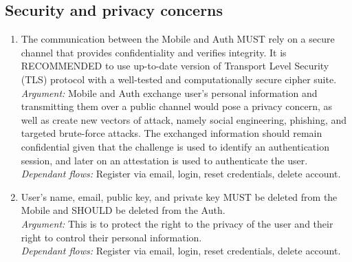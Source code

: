     \subsection{Security and privacy concerns}
        \begin{enumerate}
                \item The communication between the Mobile and Auth MUST rely on a secure channel that provides 
                    confidentiality and verifies integrity. It is RECOMMENDED to use up-to-date version of 
                    Transport Level Security (TLS) protocol with a well-tested and computationally secure 
                    cipher suite.\\      
                \textit{Argument:} Mobile and Auth exchange user's personal information and transmitting them over a 
                                public channel would pose a privacy concern, as well as create new vectors of attack, 
                                namely social engineering, phishing, and targeted brute-force attacks. The exchanged 
                                information should remain confidential given that the challenge is used to identify 
                                an authentication session, and later on an attestation is used to authenticate the user.\\
                \textit{Dependant flows:} Register via email, login, reset credentials, delete account. 

                \item User's name, email, public key, and private key MUST be deleted from the Mobile and SHOULD be 
                    deleted from the Auth.\\        
                \textit{Argument:} This is to protect the right to the privacy of the user and their right to control 
                                their personal information.\\
                \textit{Dependant flows:} Register via email, login, reset credentials, delete account.  
        \end{enumerate}